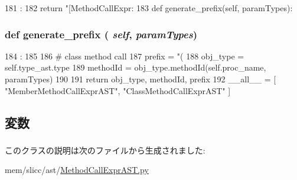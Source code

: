\begin{DoxyCode}
181                       :
182         return "[MethodCallExpr: %
183 
    def generate_prefix(self, paramTypes):
\end{DoxyCode}
\hypertarget{classslicc_1_1ast_1_1MethodCallExprAST_1_1ClassMethodCallExprAST_a706f9a281c5b0d05f80923a37adfa48e}{
\subsubsection[{generate\_\-prefix}]{\setlength{\rightskip}{0pt plus 5cm}def generate\_\-prefix ( {\em self}, \/   {\em paramTypes})}}
\label{classslicc_1_1ast_1_1MethodCallExprAST_1_1ClassMethodCallExprAST_a706f9a281c5b0d05f80923a37adfa48e}



\begin{DoxyCode}
184                                          :
185 
186         # class method call
187         prefix = "(%
188         obj_type = self.type_ast.type
189         methodId = obj_type.methodId(self.proc_name, paramTypes)
190 
191         return obj_type, methodId, prefix
192 
__all__ = [ "MemberMethodCallExprAST", "ClassMethodCallExprAST" ]
\end{DoxyCode}


\subsection{変数}
\hypertarget{classslicc_1_1ast_1_1MethodCallExprAST_1_1ClassMethodCallExprAST_a2c41e611550596541faa6f64ffecc139}{
\subsubsection[{type\_\-ast}]{}}
\label{classslicc_1_1ast_1_1MethodCallExprAST_1_1ClassMethodCallExprAST_a2c41e611550596541faa6f64ffecc139}


このクラスの説明は次のファイルから生成されました:\begin{DoxyCompactItemize}
\item 
mem/slicc/ast/\hyperlink{MethodCallExprAST_8py}{MethodCallExprAST.py}\end{DoxyCompactItemize}
